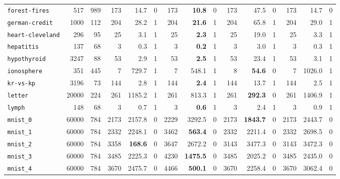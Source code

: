 \begin{tabular}{lccrrrrrrrrrrrr}
\texttt{forest-fires} & \multicolumn{1}{r}{517} & \multicolumn{1}{r}{989}  & 173 & 14.7 & 0 & 173 & \textbf{10.8} & 0 & 173 & 47.5 & 0 & 173 & 14.7 & 0\\
\texttt{german-credit} & \multicolumn{1}{r}{1000} & \multicolumn{1}{r}{112}  & 204 & 28.2 & 1 & 204 & \textbf{21.6} & 1 & 204 & 65.8 & 1 & 204 & 29.0 & 1\\
\texttt{heart-cleveland} & \multicolumn{1}{r}{296} & \multicolumn{1}{r}{95}  & 25 & 3.1 & 1 & 25 & \textbf{2.3} & 1 & 25 & 19.0 & 1 & 25 & 3.3 & 1\\
\texttt{hepatitis} & \multicolumn{1}{r}{137} & \multicolumn{1}{r}{68}  & 3 & 0.3 & 1 & 3 & \textbf{0.2} & 1 & 3 & 3.0 & 1 & 3 & 0.3 & 1\\
\texttt{hypothyroid} & \multicolumn{1}{r}{3247} & \multicolumn{1}{r}{88}  & 53 & 2.9 & 1 & 53 & \textbf{2.5} & 1 & 53 & 23.4 & 1 & 53 & 3.1 & 1\\
\texttt{ionosphere} & \multicolumn{1}{r}{351} & \multicolumn{1}{r}{445}  & 7 & 729.7 & 1 & 7 & 548.1 & 1 & 8 & \textbf{54.6} & 0 & 7 & 1026.0 & 1\\
\texttt{kr-vs-kp} & \multicolumn{1}{r}{3196} & \multicolumn{1}{r}{73}  & 144 & 2.8 & 1 & 144 & \textbf{2.4} & 1 & 144 & 13.7 & 1 & 144 & 2.5 & 1\\
\texttt{letter} & \multicolumn{1}{r}{20000} & \multicolumn{1}{r}{224}  & 261 & 1185.2 & 1 & 261 & 813.3 & 1 & 261 & \textbf{292.3} & 0 & 261 & 1406.9 & 1\\
\texttt{lymph} & \multicolumn{1}{r}{148} & \multicolumn{1}{r}{68}  & 3 & 0.7 & 1 & 3 & \textbf{0.6} & 1 & 3 & 2.4 & 1 & 3 & 0.9 & 1\\
\texttt{mnist\_0} & \multicolumn{1}{r}{60000} & \multicolumn{1}{r}{784}  & 2173 & 2157.8 & 0 & 2229 & 3292.5 & 0 & 2173 & \textbf{1843.7} & 0 & 2173 & 2443.7 & 0\\
\texttt{mnist\_1} & \multicolumn{1}{r}{60000} & \multicolumn{1}{r}{784}  & 2332 & 2248.1 & 0 & 3462 & \textbf{563.4} & 0 & 2332 & 2211.4 & 0 & 2332 & 2698.5 & 0\\
\texttt{mnist\_2} & \multicolumn{1}{r}{60000} & \multicolumn{1}{r}{784}  & 3358 & \textbf{168.6} & 0 & 3647 & 2672.2 & 0 & 3143 & 3477.3 & 0 & 3143 & 3472.3 & 0\\
\texttt{mnist\_3} & \multicolumn{1}{r}{60000} & \multicolumn{1}{r}{784}  & 3485 & 2225.3 & 0 & 4230 & \textbf{1475.5} & 0 & 3485 & 2025.2 & 0 & 3485 & 2435.0 & 0\\
\texttt{mnist\_4} & \multicolumn{1}{r}{60000} & \multicolumn{1}{r}{784}  & 3670 & 2475.7 & 0 & 4466 & \textbf{500.1} & 0 & 3670 & 2258.4 & 0 & 3670 & 3062.4 & 0\\

\end{tabular}
